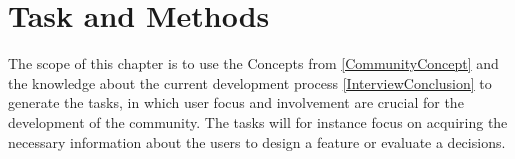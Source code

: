 \chapter{Task and Methods}
\label{TaskAndMethods}
The scope of this chapter is to use the Concepts from \autoref{CommunityConcept} and the knowledge about the current development process \autoref{InterviewConclusion} to generate the tasks, in which user focus and involvement are crucial for the development of the community. The tasks will for instance focus on acquiring the necessary information about the users to design a feature or evaluate a decisions. 